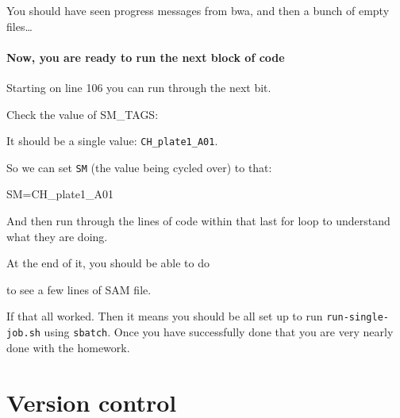 \documentclass[]{krantz}
\makeatletter
\newenvironment{Shaded}{\begin{snugshade}}{\end{snugshade}}
\newcommand{\BuiltInTok}[1]{#1}
\newcommand{\ExtensionTok}[1]{#1}
\newcommand{\FunctionTok}[1]{\textcolor[rgb]{0,0,0}{#1}}
\newcommand{\KeywordTok}[1]{\textcolor[rgb]{0.27,0.27,0.27}{\textbf{#1}}}
\newcommand{\NormalTok}[1]{#1}
\newcommand{\VariableTok}[1]{\textcolor[rgb]{0,0,0}{#1}}
\newenvironment{kframe}{%
\medskip{}
\setlength{\fboxsep}{.8em}
 \def\at@end@of@kframe{}%
 \ifinner\ifhmode%
  \def\at@end@of@kframe{\end{minipage}}%
  \begin{minipage}{\columnwidth}%
 \fi\fi%
 \def\FrameCommand##1{\hskip\@totalleftmargin \hskip-\fboxsep
 \colorbox{shadecolor}{##1}\hskip-\fboxsep
     \hskip-\linewidth \hskip-\@totalleftmargin \hskip\columnwidth}%
 \MakeFramed {\advance\hsize-\width
   \@totalleftmargin\z@ \linewidth\hsize
   \@setminipage}}%
 {\par\unskip\endMakeFramed%
 \at@end@of@kframe}
\renewenvironment{Shaded}{\begin{kframe}}{\end{kframe}}
\makeatother
\begin{document}
You should have seen progress messages from bwa, and then a bunch of empty files\ldots{}

\hypertarget{now-you-are-ready-to-run-the-next-block-of-code}{%
\subsubsection{Now, you are ready to run the next block of code}\label{now-you-are-ready-to-run-the-next-block-of-code}}

Starting on line 106 you can run through the next bit.

Check the value of SM\_TAGS:

\begin{Shaded}
\end{Shaded}

It should be a single value: \texttt{CH\_plate1\_A01}.

So we can set \texttt{SM} (the value being cycled over) to that:

\begin{Shaded}
\begin{Highlighting}[]
\VariableTok{SM=}\NormalTok{CH_plate1_A01}
\end{Highlighting}
\end{Shaded}

And then run through the lines of code within that last for loop to
understand what they are doing.

At the end of it, you should be able to do

\begin{Shaded}
\end{Shaded}

to see a few lines of SAM file.

If that all worked. Then it means you should be all set
up to run \texttt{run-single-job.sh} using \texttt{sbatch}. Once you have
successfully done that you are very nearly done with the homework.

\hypertarget{version-control}{%
\chapter{Version control}\label{version-control}}
\end{document}
